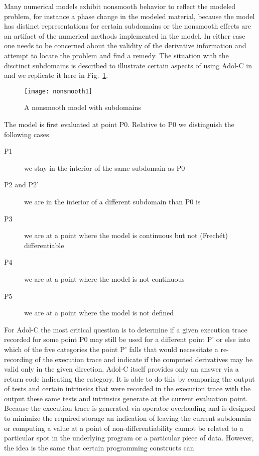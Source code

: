 \documentclass{article}
\newcommand{\reffig}[1]{{Fig.~\ref{#1}}}
\begin{document}
Many numerical models exhibit nonsmooth behavior to reflect the modeled problem, 
for instance a phase change in the modeled material, because the 
model has distinct representations for certain subdomains or the nonsmooth effects 
are an artifact of the numerical methods implemented in the model.
In either case one needs to be concerned about the validity of the 
derivative information and attempt to locate the problem and  find a remedy.  
The situation with the disctinct subdomains is described to illustrate 
certain aspects of using Adol-C in \cite{adolc} and we 
replicate it here in \reffig{fig:subdomains}. 
\begin{figure}
\centerline{\texttt{[image: nonsmooth1]}}
\caption{A nonsmooth model with subdomains}\label{fig:subdomains} 
\end{figure}
The model is first evaluated at point P0.  Relative to P0 we distinguish the 
following cases
\begin{description}
\item[P1] we stay in the interior of the same subdomain as P0 
\item[P2 and P2'] we are in the interior of a different subdomain than P0 is
\item[P3] we are at a point where the model is continuous but not (Frech\'et) differentiable
\item[P4] we are at a point where the model is not continuous
\item[P5] we are at a point where the model is not defined
\end{description}    
For Adol-C the most critical question is to determine if a given execution trace 
recorded for some point P0 may still be used for a different point P' or else 
into which of the five categories  the point P' falls that would necessitate 
a re-recording of the execution trace and indicate if the computed derivatives 
may be valid only in the given direction. Adol-C itself provides only an answer 
via a return code indicating the category. 
It is able to do this by comparing the output of tests and certain intrinsics 
that were recorded in the execution trace with the output these same tests and intrinsics 
generate at the current evaluation point. 
Because the execution trace is generated via operator overloading and is designed to 
minimize the required storage an indication of leaving the current subdomain or computing 
a value at a point of non-differentiability cannot be related to a particular spot in 
the underlying program or a particular piece of data. 
However, the idea is the same that certain programming constructs can
\end{document}
